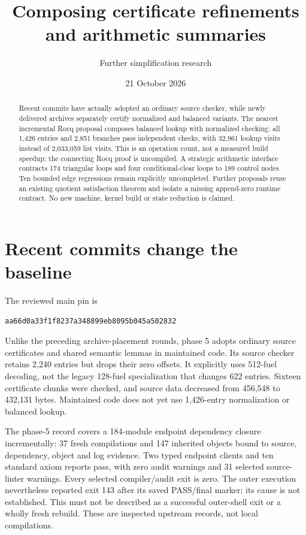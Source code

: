 \documentclass[11pt]{article}
\title{Composing certificate refinements and arithmetic summaries}
\author{Further simplification research}\date{21 October 2026}
\begin{document}
\maketitle
\begin{abstract}
Recent commits have actually adopted an ordinary source checker, while newly delivered archives separately certify normalized and balanced variants. The nearest incremental Rocq proposal composes balanced lookup with normalized checking: all 1,426 entries and 2,851 branches pass independent checks, with 32,961 lookup visits instead of 2,033,059 list visits. This is an operation count, not a measured build speedup; the connecting Rocq proof is uncompiled. A strategic arithmetic interface contracts 174 triangular loops and four conditional-clear loops to 189 control nodes. Ten bounded edge regressions remain explicitly uncompleted. Further proposals reuse an existing quotient satisfaction theorem and isolate a missing append-zero runtime contract. No new machine, kernel build or state reduction is claimed.
\end{abstract}

\section{Recent commits change the baseline}
The reviewed main pin is
\begin{verbatim}
aa66d0a33f1f8237a348899eb8095b045a502832
\end{verbatim}
Unlike the preceding archive-placement rounds, phase 5 adopts ordinary source certificates and shared semantic lemmas in maintained code. Its source checker retains 2,240 entries but drops their zero offsets. It explicitly uses 512-fuel decoding, not the legacy 128-fuel specialization that changes 622 entries. Sixteen certificate chunks were checked, and source data decreased from 456,548 to 432,131 bytes. Maintained code does not yet use 1,426-entry normalization or balanced lookup.

The phase-5 record covers a 184-module endpoint dependency closure incrementally: 37 fresh compilations and 147 inherited objects bound to source, dependency, object and log evidence. Two typed endpoint clients and ten standard axiom reports pass, with zero audit warnings and 31 selected source-linter warnings. Every selected compiler/audit exit is zero. The outer execution nevertheless reported exit 143 after its saved PASS/final marker; its cause is not established. This must not be described as a successful outer-shell exit or a wholly fresh rebuild. These are inspected upstream records, not local compilations.
\end{document}

